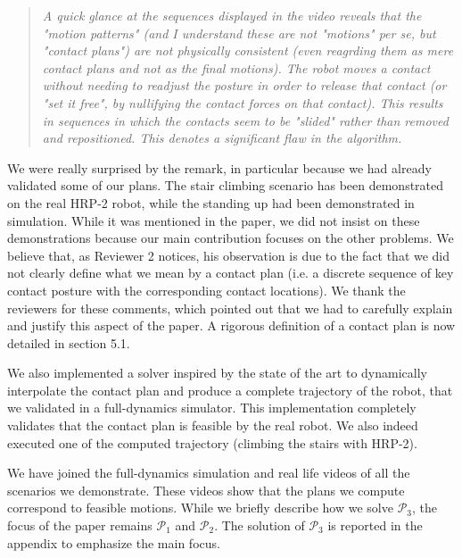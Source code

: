 \documentclass[a4paper]{article}
\begin{document}
\begin{quote}
  \textit{A quick glance at the sequences displayed in the video reveals that the "motion patterns" (and I understand these are not "motions" per se, but "contact plans") are not physically consistent (even reagrding them as mere contact plans and not as the final motions). The robot moves a contact without needing to readjust the posture in order to release that contact (or "set it free", by nullifying the contact forces on that contact). This results in sequences in which the contacts seem to be "slided" rather than removed and repositioned. This denotes a significant flaw in the algorithm.   }
\end{quote}

We were really surprised by the remark, in particular because we had already validated some of our plans.
The stair climbing scenario has been demonstrated on the real HRP-2 robot, while the standing up had been demonstrated in simulation. 
While it was mentioned in the paper, we did not insist on these demonstrations because our main contribution focuses on the other problems. 
We believe that, as Reviewer 2 notices, his observation is due to the fact that we did not clearly define what we mean by a contact plan (i.e. a discrete sequence of key contact posture with the corresponding contact locations).
We thank the reviewers for these comments, which pointed out that we had to carefully explain and justify this aspect of the paper.
A rigorous definition of a contact plan is now detailed in section 5.1. 


We also implemented a solver inspired by the state of the art to dynamically interpolate the contact plan and produce a complete trajectory of the robot, that we validated in a full-dynamics simulator. 
This implementation completely validates that the contact plan is feasible by the real robot.
We also indeed executed one of the computed trajectory (climbing the stairs with HRP-2).

We have joined the full-dynamics simulation and real life videos of all the scenarios we demonstrate.
These videos show that the plans we compute correspond to feasible motions.
While we briefly describe how we solve $\mathcal{P}_3$, the focus of the paper remains $\mathcal{P}_1$ and $\mathcal{P}_2$. 
The solution of $\mathcal{P}_3$ is reported in the appendix to emphasize the main focus.
\end{document}
